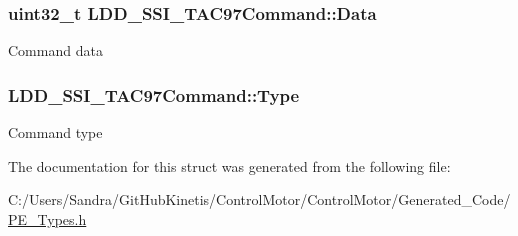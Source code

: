 \subsubsection[{\texorpdfstring{Data}{Data}}]{\setlength{\rightskip}{0pt plus 5cm}uint32\+\_\+t L\+D\+D\+\_\+\+S\+S\+I\+\_\+\+T\+A\+C97\+Command\+::\+Data}\hypertarget{struct_l_d_d___s_s_i___t_a_c97_command_abc16535d09d61f2c3f885adf91632117}{}\label{struct_l_d_d___s_s_i___t_a_c97_command_abc16535d09d61f2c3f885adf91632117}
Command data 
\subsubsection[{\texorpdfstring{Type}{Type}}]{ L\+D\+D\+\_\+\+S\+S\+I\+\_\+\+T\+A\+C97\+Command\+::\+Type}\hypertarget{struct_l_d_d___s_s_i___t_a_c97_command_ac7226beaf57a764f71faf7e822e27a6e}{}\label{struct_l_d_d___s_s_i___t_a_c97_command_ac7226beaf57a764f71faf7e822e27a6e}
Command type 

The documentation for this struct was generated from the following file\+:\begin{DoxyCompactItemize}
\item 
C\+:/\+Users/\+Sandra/\+Git\+Hub\+Kinetis/\+Control\+Motor/\+Control\+Motor/\+Generated\+\_\+\+Code/\hyperlink{_p_e___types_8h}{P\+E\+\_\+\+Types.\+h}\end{DoxyCompactItemize}
